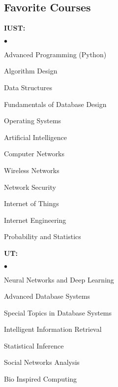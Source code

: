 \documentclass[margin,line]{res}
\newenvironment{list2}{
  \begin{list}{$\bullet$}{%
      \setlength{\itemsep}{0in}
      \setlength{\parsep}{0in} \setlength{\parskip}{0in}
      \setlength{\topsep}{0in} \setlength{\partopsep}{0in}
      \setlength{\leftmargin}{0.2in}}}{\end{list}}
\begin{document}
\begin{resume}
\section{\sc Favorite Courses}
{\bf  IUST:}\\
\begin{list2}
\item  Advanced Programming (Python)\\
\item  Algorithm Design\\
\item  Data Structures\\
\item  Fundamentals of Database Design\\
\item  Operating Systems \\
\item  Artificial Intelligence \\
\item  Computer Networks\\
\item  Wireless Networks\\
\item  Network Security\\
\item  Internet of Things \\
\item  Internet Engineering\\
\item  Probability and Statistics
\end{list2}
{\bf UT:}\\
\begin{list2}
\item  Neural Networks and Deep Learning\\
\item  Advanced Database Systems\\
\item  Special Topics in Database Systems\\
\item  Intelligent Information Retrieval\\
\item  Statistical Inference\\
\item  Social Networks Analysis\\
\item  Bio Inspired Computing\\
\end{list2}
\end{resume}
\end{document}
